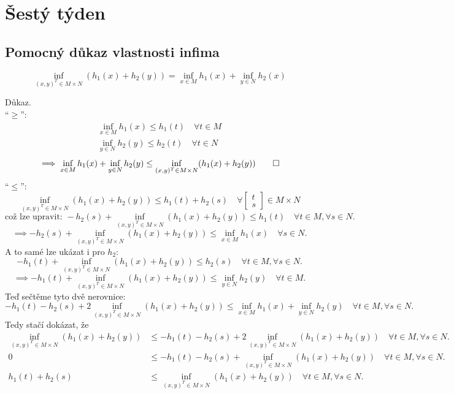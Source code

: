 \section{Šestý týden}

\subsection{Pomocný důkaz vlastnosti infima}
\[
    \inf_{(x, y)^T \in M \times N} (h_1(x) + h_2(y)) = \inf_{x\in M}h_1(x) + \inf_{y\in N}h_2(x)
\]

Důkaz.\\
\enquote{$\geq$}:
\begin{align*}
    \inf_{x \in M} h_1(x) \leq h_1(t) \quad \forall t \in M \\
    \inf_{y \in N} h_2(y) \leq h_2(t) \quad \forall t \in N
\end{align*}
\[
    \implies \inf_{x\in M} h_1(x) + \inf_{y\in N}h_2(y) \leq \inf_{(x,y)^T \in M \times N}(h_1(x) + h_2(y)) \qed
\]
\enquote{$\leq$}:
\[
    \inf_{(x,y)^T \in M \times N}(h_1(x) + h_2(y)) \leq h_1(t) + h_2(s) \quad \forall 
    \begin{bmatrix}
        t \\
        s    
    \end{bmatrix} \in M \times N
\]
\[
    \text{což lze upravit: } -h_2(s) + \inf_{(x, y)^T \in M \times N}(h_1(x) + h_2(y)) \leq h_1(t) \quad \forall t\in M, 
    \forall s\in N.
\]
\[
    \implies -h_2(s) + \inf_{(x, y)^T \in M \times N}(h_1(x) + h_2(y)) \leq \inf_{x\in M} h_1(x) \quad \forall s\in N.
\]
A to samé lze ukázat i pro $h_2$:
\[
    -h_1(t) + \inf_{(x, y)^T \in M \times N}(h_1(x) + h_2(y)) \leq h_2(s) \quad \forall t\in M, \forall s\in N.
\]
\[
    \implies -h_1(t) + \inf_{(x, y)^T \in M \times N}(h_1(x) + h_2(y)) \leq \inf_{y\in N} h_2(y) \quad \forall t\in M.
\]
Teď sečtěme tyto dvě nerovnice:
\[
    -h_1(t) - h_2(s) + 2 \inf_{(x, y)^T \in M \times N}(h_1(x) + h_2(y)) \leq \inf_{x\in M} h_1(x) + \inf_{y\in N} h_2(y)
    \quad \forall t\in M, \forall s\in N.
\]
Tedy stačí dokázat, že
\begin{align*}
    \inf_{(x,y)^T \in M \times N}(h_1(x) + h_2(y)) &\leq -h_1(t) - h_2(s) + 2 \inf_{(x, y)^T \in M \times N}(h_1(x) + h_2(y)) 
    \quad \forall t\in M, \forall s\in N.\\
    0 &\leq -h_1(t) - h_2(s) + \inf_{(x, y)^T \in M \times N}(h_1(x) + h_2(y)) \quad \forall t\in M, \forall s\in N.\\
    h_1(t) + h_2(s) &\leq \inf_{(x, y)^T \in M \times N}(h_1(x) + h_2(y)) \quad \forall t\in M, \forall s\in N.
\end{align*}

